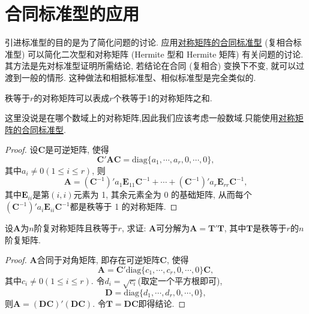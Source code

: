 \documentclass[../../main.tex]{subfiles}
\begin{document}
\section{合同标准型的应用}

引进标准型的目的是为了简化问题的讨论. 应用\hyperref[theorem:对称矩阵的合同标准型]{对称矩阵的合同标准型} (复相合标准型) 可以简化二次型和对称矩阵 (Hermite 型和 Hermite 矩阵) 有关问题的讨论. 其方法是先对标准型证明所需结论, 若结论在合同 (复相合) 变换下不变, 就可以过渡到一般的情形. 这种做法和相抵标准型、相似标准型是完全类似的.

\begin{proposition}[对称矩阵的秩1分解]\label{proposition:对称矩阵的秩1分解}
秩等于$r$的对称矩阵可以表成$r$个秩等于1的对称矩阵之和.
\end{proposition}
\begin{remark}
这里没说是在哪个数域上的对称矩阵,因此我们应该考虑一般数域.只能使用\hyperref[theorem:对称矩阵的合同标准型]{对称矩阵的合同标准型}.
\end{remark}
\begin{proof}
设$\boldsymbol{C}$是可逆矩阵, 使得
\[
\boldsymbol{C}'\boldsymbol{A}\boldsymbol{C}=\text{diag}\{a_1, \cdots, a_r, 0, \cdots, 0\},
\]
其中$a_i\neq 0 (1\leq i\leq r)$, 则
\[
\boldsymbol{A}=(\boldsymbol{C}^{-1})'a_1\boldsymbol{E}_{11}\boldsymbol{C}^{-1}+\cdots+(\boldsymbol{C}^{-1})'a_r\boldsymbol{E}_{rr}\boldsymbol{C}^{-1},
\]
其中$\boldsymbol{E}_{ii}$是第$(i, i)$元素为 1, 其余元素全为 0 的基础矩阵, 从而每个$(\boldsymbol{C}^{-1})'a_i\boldsymbol{E}_{ii}\boldsymbol{C}^{-1}$都是秩等于 1 的对称矩阵. 
\end{proof}

\begin{proposition}\label{proposition:复对称阵都可分解成相同秩的复矩阵与其转置的乘积}
设$\boldsymbol{A}$为$n$阶复对称矩阵且秩等于$r$, 求证: $\boldsymbol{A}$可分解为$\boldsymbol{A}=\boldsymbol{T}'\boldsymbol{T}$, 其中$\boldsymbol{T}$是秩等于$r$的$n$阶复矩阵.
\end{proposition}
\begin{proof}
$\boldsymbol{A}$合同于对角矩阵, 即存在可逆矩阵$\boldsymbol{C}$, 使得
\[
\boldsymbol{A}=\boldsymbol{C}'\text{diag}\{c_1, \cdots, c_r, 0, \cdots, 0\}\boldsymbol{C},
\]
其中$c_i\neq 0 (1\leq i\leq r)$. 令$d_i = \sqrt{c_i}$(取定一个平方根即可),
\[
\boldsymbol{D}=\text{diag}\{d_1, \cdots, d_r, 0, \cdots, 0\},
\]
则$\boldsymbol{A}=(\boldsymbol{D}\boldsymbol{C})'(\boldsymbol{D}\boldsymbol{C})$. 令$\boldsymbol{T}=\boldsymbol{D}\boldsymbol{C}$即得结论. 
\end{proof}
\end{document}
